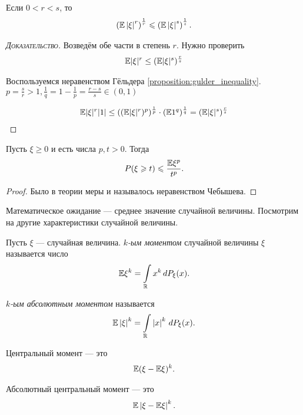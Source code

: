 \documentclass[../main.tex]{subfiles}
\begin{document}
\begin{prop}
 \label{proposition:Lyapunov_inequality}
 Если $ 0 < r < s $, то 
 \begin{align*}
  \left(\mathbb E \left| \xi \right|^{r} \right)^{\frac{1}{r}} \leqslant \left( \mathbb E \left| \xi \right|^{s} \right)^{\frac{1}{s}}.
 \end{align*} 
\end{prop}
\begin{proof}[\normalfont\textsc{Доказательство}]
	Возведём обе части в степень $r$. Нужно проверить 
	\begin{align*}
		\mathbb E |\xi|^r \le (\mathbb E |\xi|^s)^{\frac{r}{s}}
	\end{align*}

	Воспользуемся неравенством Гёльдера \ref{proposition:gulder_inequality}. $p = \frac{s}{r} > 1, \frac{1}{q} = 1 - \frac{1}{p} = \frac{r - s}{s} \in (0, 1)$

	\begin{align*}
		\mathbb E |\xi|^r |1| \le ((\mathbb E |\xi|^r)^p)^{\frac{1}{p}} \cdot (\mathbb E 1^q)^{\frac{1}{q}} = (\mathbb E |\xi|^s)^{\frac{r}{s}}
	\end{align*}
	
\end{proof}


\begin{prop}
 Пусть $ \xi \geqslant 0 $ и есть числа $ p,t > 0 $. Тогда
  \begin{align}
   \label{equation:markov_inequality}
  P(\xi \geqslant t) \leqslant \frac{\mathbb E \xi^{p}}{t^{p}}.
 \end{align}  
\end{prop}

\begin{proof}
	Было в теории меры и называлось неравенством Чебышева.

\end{proof}

Математическое ожидание --- среднее значение случайной величины. Посмотрим на другие характеристики случайной величины.

\begin{df}
 Пусть $ \xi $ --- случайная величина. \textit{$ k $-ым моментом} случайной величины $ \xi $ называется число
 \begin{align*}
  \mathbb E \xi^{k} = \int\limits_{\mathbb{R}} x^{k}\,dP_{\xi}(x).
 \end{align*} 

  \textit{$ k $-ым абсолютным моментом} называется
 \begin{align*}
  \mathbb E \left| \xi \right|^{k} = \int\limits_{\mathbb{R}} \left| x \right|^{k}\,dP_{\xi} (x).
 \end{align*} 

 Центральный момент --- это
 \begin{align*}
  \mathbb E (\xi - \mathbb E \xi)^{k}.
 \end{align*} 

 Абсолютный центральный момент --- это
 \begin{align*}
  \mathbb E \left| \xi - \mathbb E \xi \right|^{k}.
 \end{align*} 
\end{df}
\end{document}
